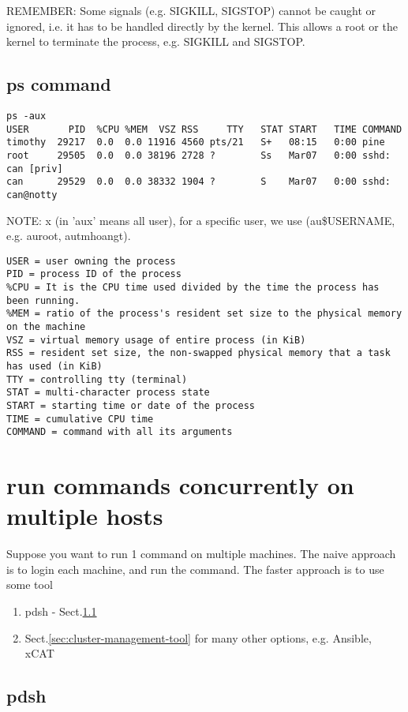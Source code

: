 REMEMBER: Some signals (e.g. SIGKILL, SIGSTOP) cannot be caught or ignored, i.e.
it has to be handled directly by the kernel. This allows a root or the kernel to
terminate the process, e.g. SIGKILL and SIGSTOP.

\subsection{ps command}

\begin{verbatim}
ps -aux
USER       PID  %CPU %MEM  VSZ RSS     TTY   STAT START   TIME COMMAND
timothy  29217  0.0  0.0 11916 4560 pts/21   S+   08:15   0:00 pine  
root     29505  0.0  0.0 38196 2728 ?        Ss   Mar07   0:00 sshd: can [priv]   
can      29529  0.0  0.0 38332 1904 ?        S    Mar07   0:00 sshd: can@notty  
\end{verbatim}
NOTE: x (in 'aux' means all user), for a specific user, we use (au\$USERNAME,
e.g. auroot, autmhoangt).

{\tiny
\begin{verbatim}
USER = user owning the process
PID = process ID of the process
%CPU = It is the CPU time used divided by the time the process has been running.
%MEM = ratio of the process's resident set size to the physical memory on the machine
VSZ = virtual memory usage of entire process (in KiB)
RSS = resident set size, the non-swapped physical memory that a task has used (in KiB)
TTY = controlling tty (terminal)
STAT = multi-character process state
START = starting time or date of the process
TIME = cumulative CPU time
COMMAND = command with all its arguments
\end{verbatim}
}

\section{run commands concurrently on multiple hosts}

Suppose you want to run 1 command on multiple machines. The naive approach is to
login each machine, and run the command. The faster approach is to use some tool
\begin{enumerate}
  \item pdsh - Sect.\ref{sec:pdsh}
  
  \item Sect.\ref{sec:cluster-management-tool} for many other options, e.g. Ansible, xCAT
\end{enumerate}

\subsection{pdsh}
\label{sec:pdsh}

